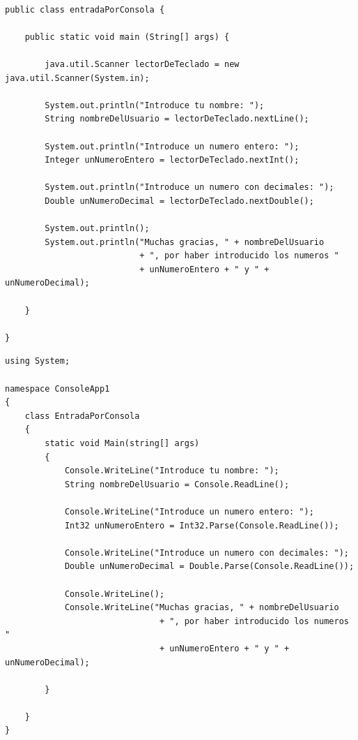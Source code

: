 \documentclass[spanish,12pt,a4paper,final,oneside]{book}
\begin{document}
\begin{lstlisting}[frame=single, caption=lenguaje java]

public class entradaPorConsola {
	
    public static void main (String[] args) {
		
        java.util.Scanner lectorDeTeclado = new java.util.Scanner(System.in);
        
        System.out.println("Introduce tu nombre: ");
        String nombreDelUsuario = lectorDeTeclado.nextLine();
        
        System.out.println("Introduce un numero entero: ");
        Integer unNumeroEntero = lectorDeTeclado.nextInt();
        
        System.out.println("Introduce un numero con decimales: ");
        Double unNumeroDecimal = lectorDeTeclado.nextDouble();
        
        System.out.println();
        System.out.println("Muchas gracias, " + nombreDelUsuario 
                           + ", por haber introducido los numeros "
                           + unNumeroEntero + " y " + unNumeroDecimal);
	
    }
    
}
\end{lstlisting}

\begin{lstlisting}[frame=single, caption=lenguaje C\#]
using System;

namespace ConsoleApp1
{
    class EntradaPorConsola
    {
        static void Main(string[] args)
        {
            Console.WriteLine("Introduce tu nombre: ");
            String nombreDelUsuario = Console.ReadLine();

            Console.WriteLine("Introduce un numero entero: ");
            Int32 unNumeroEntero = Int32.Parse(Console.ReadLine());

            Console.WriteLine("Introduce un numero con decimales: ");
            Double unNumeroDecimal = Double.Parse(Console.ReadLine());

            Console.WriteLine();
            Console.WriteLine("Muchas gracias, " + nombreDelUsuario
                               + ", por haber introducido los numeros "
                               + unNumeroEntero + " y " + unNumeroDecimal);

        }

    }
}
\end{lstlisting}
\end{document}
